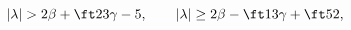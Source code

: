 \begin{equation}
|\lambda|>2\beta+\ft23\gamma-5,\qquad
|\lambda|\ge2\beta-\ft13\gamma+\ft52,
\end{equation}

